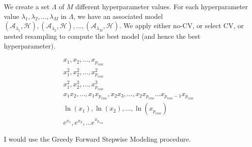 \documentclass[12pt]{article}
\begin{document}
\begin{enumerate}

We create a set $\Lambda$ of $M$ different hyperparameter values. For each hyperparameter
value $\lambda_1,\lambda_2,\ldots,\lambda_M$ in $\Lambda$, we have
an associated model $(\mathcal{A}_{\lambda_1}, \mathcal{H}), (\mathcal{A}_{\lambda_2}, \mathcal{H}),\ldots,(\mathcal{A}_{\lambda_M}, \mathcal{H})$. We apply either
no-CV, or select CV, or nested resampling to compute the best model (and hence
the best hyperparameter).


\begin{align*}
	&x_1, x_2, \ldots, x_{p_{raw}}\\
	&x_1^2, x_2^2, \ldots, x_{p_{raw}}^2\\
	&x_1^2, x_2^3, \ldots, x_{p_{raw}}^3\\
	&x_1 x_2, \ldots, x_1 x_{p_{raw}}, x_2 x_3,\ldots, x_2 x_{p_{raw}}
	\ldots x_{p_{raw}-1} x_{p_{raw}}\\
	&\ln(x_1),\ln(x_2),\ldots,\ln(x_{p_{raw}})\\
	&e^{x_1}, e^{x_2},\ldots e^{x_{p_{raw}}}
\end{align*}



I would use the Greedy Forward Stepwise Modeling procedure.


\end{enumerate}
\end{document}

